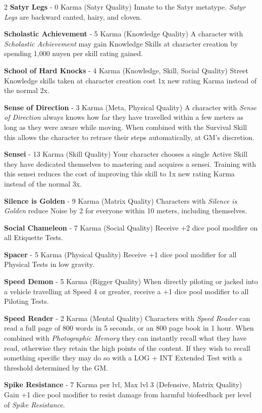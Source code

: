 \documentclass[
  oneside]{article}
\begin{document}
\begin{multicols}{2}
\textbf{Satyr Legs} - 0 Karma (Satyr Quality)
Innate to the Satyr metatype. \emph{Satyr Legs}
are backward canted, hairy, and cloven.

\textbf{Scholastic Achievement} - 5 Karma
(Knowledge Quality) A character with
\emph{Scholastic Achievement} may gain Knowledge
Skills at character creation by spending 1,000
nuyen per skill rating gained.

\textbf{School of Hard Knocks} - 4 Karma
(Knowledge, Skill, Social Quality) Street
Knowledge skills taken at character creation cost
1x new rating Karma instead of the normal 2x.

\textbf{Sense of Direction} - 3 Karma (Meta,
Physical Quality) A character with \emph{Sense of
Direction} always knows how far they have
travelled within a few meters as long as they were
aware while moving. When combined with the
Survival Skill this allows the character to
retrace their steps automatically, at GM's
discretion.

\textbf{Sensei} - 13 Karma (Skill Quality) Your
character chooses a single Active Skill they have
dedicated themselves to mastering and acquires a
sensei. Training with this sensei reduces the cost
of improving this skill to 1x new rating Karma
instead of the normal 3x.

\textbf{Silence is Golden} - 9 Karma (Matrix
Quality) Characters with \emph{Silence is Golden}
reduce Noise by 2 for everyone within 10 meters,
including themselves.

\textbf{Social Chameleon} - 7 Karma (Social
Quality) Receive +2 dice pool modifier on all
Etiquette Tests.

\textbf{Spacer} - 5 Karma (Physical Quality)
Receive +1 dice pool modifier for all Physical
Tests in low gravity.

\textbf{Speed Demon} - 5 Karma (Rigger Quality)
When directly piloting or jacked into a vehicle
travelling at Speed 4 or greater, receive a +1
dice pool modifier to all Piloting Tests.

\textbf{Speed Reader} - 2 Karma (Mental Quality)
Characters with \emph{Speed Reader} can read a
full page of 800 words in 5 seconds, or an 800
page book in 1 hour. When combined with
\emph{Photographic Memory} they can instantly
recall what they have read, otherwise they retain
the high points of the content. If they wish to
recall something specific they may do so with a
LOG + INT Extended Test with a threshold
determined by the GM.

\textbf{Spike Resistance} - 7 Karma per lvl, Max
lvl 3 (Defensive, Matrix Quality) Gain +1 dice
pool modifier to resist damage from harmful
biofeedback per level of \emph{Spike Resistance}.


\end{multicols}
\end{document}
